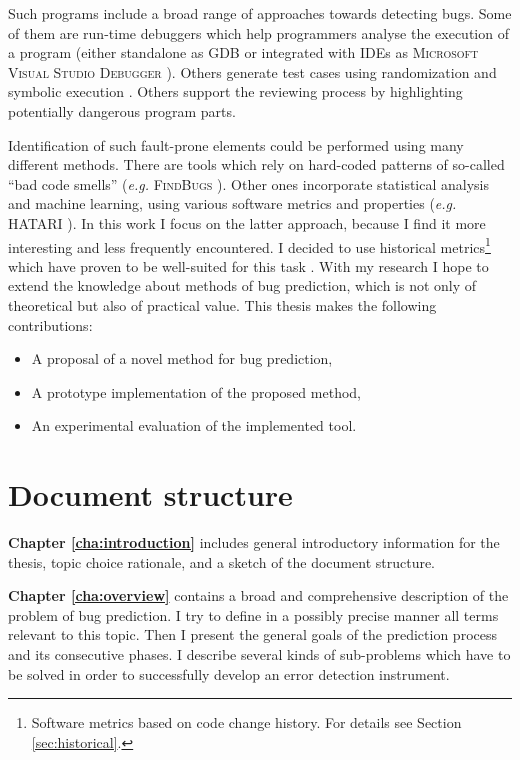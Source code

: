 \documentclass{pracamgr}
\newcommand{\bpar}[1]{\medskip\noindent\textbf{#1}}
\begin{document}
Such programs include a broad range of approaches towards detecting bugs. Some of them are run-time debuggers which help programmers analyse the execution of a program (either standalone as GDB \cite{gdb} or integrated with IDEs as \textsc{Microsoft Visual Studio Debugger} \cite{vs_debugger}). Others generate test cases using randomization and symbolic execution \cite{symbolic, puzzle}. Others support the reviewing process by highlighting potentially dangerous program parts.

Identification of such fault-prone elements could be performed using many different methods. There are tools which rely on hard-coded patterns of so-called ``bad code smells'' (\textit{e.g.} \textsc{FindBugs} \cite{findbugs}). Other ones incorporate statistical analysis and machine learning, using various software metrics and properties (\textit{e.g.} HATARI \cite{hatari}). In this work I focus on the latter approach, because I find it more interesting and less frequently encountered. I decided to use historical metrics\footnote{Software metrics based on code change history. For details see Section \ref{sec:historical}.} which have proven to be well-suited for this task \cite{merits, comparative, how_and_why}. With my research I hope to extend the knowledge about methods of bug prediction, which is not only of theoretical but also of practical value. This thesis makes the following contributions:
\begin{itemize}
	\item A proposal of a novel method for bug prediction,
	\item A prototype implementation of the proposed method,
	\item An experimental evaluation of the implemented tool.
\end{itemize}

\section{Document structure}
\label{sec:structure}

\textbf{Chapter \ref{cha:introduction}} includes general introductory information for the thesis, topic choice rationale, and a sketch of the document structure. 

\bpar{Chapter \ref{cha:overview}} contains a broad and comprehensive description of the problem of bug prediction. I try to define in a possibly precise manner all terms relevant to this topic. Then I present the general goals of the prediction process and its consecutive phases. I describe several kinds of sub-problems which have to be solved in order to successfully develop an error detection instrument.
\end{document}
